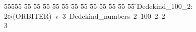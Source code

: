 %
%
\begin{tabbing}
55555 \= 55 \= 55 \= 55 \= 55 \= 55 \= 55 \= 55 \= 55 \= 55 \= 55 \= 55 \= 55 \= \>Dedekind\_100\_2:\\[0pt]
2\>$\triangleright$\>(ORBITER)\ v\ 3\ Dedekind\_numbers\ 2\ 100\ 2\ 2\\[0pt]
3\>\end{tabbing}
